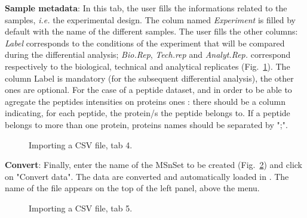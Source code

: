 \documentclass[12pt]{article}
\begin{document}
{\textbf {Sample metadata}: In this tab, the user fills the informations 
related to the samples, \textit{i.e.} the experimental design. The colum named 
\emph{Experiment} is filled by default with the name of the different samples. 
The user fills the other columns: 
\emph{Label} corresponds to the conditions of the experiment that will be 
compared during the differential analysis; \emph{Bio.Rep}, \emph{Tech.rep} 
and \emph{Analyt.Rep.} correspond respectively to the biological, technical 
and analytical replicates (Fig.~\ref{fig:imp4}). The column Label is 
mandatory (for the subsequent differential analysis), the other ones are 
optional.
\newline For the case of a peptide dataset, and in order to be able to agregate
the peptides intensities on proteins ones : there should be a column indicating,
for each peptide, the protein/s the peptide belongs to. If a peptide belongs to
more than one protein, proteins names should be separated by ";".  
\begin {figure}
\centering
{}
\caption{Importing a CSV file, tab 4.}\label{fig:imp4}
\end {figure}

\textbf {Convert}: Finally, enter the name of the MSnSet to be created 
(Fig.~\ref{fig:imp5}) and click on "Convert data". The data are converted 
and automatically loaded in . The name of the file appears 
on the top of the left panel, above the menu.
\begin {figure}
\centering
{}
\caption{Importing a CSV file, tab 5.}\label{fig:imp5}
\end {figure}


}
\end{document}
